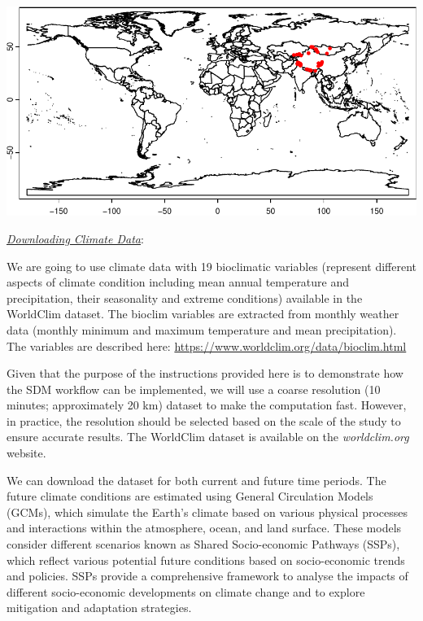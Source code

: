 \documentclass[
]{article}
\begin{document}
\includegraphics{sdm_R_files/figure-latex/unnamed-chunk-1-1.pdf}

\uline{\textit{Downloading Climate Data}}:

We are going to use climate data with 19 bioclimatic variables
(represent different aspects of climate condition including mean annual
temperature and precipitation, their seasonality and extreme conditions)
available in the WorldClim dataset. The bioclim variables are extracted
from monthly weather data (monthly minimum and maximum temperature and
mean precipitation). The variables are described here:
\url{https://www.worldclim.org/data/bioclim.html}

Given that the purpose of the instructions provided here is to
demonstrate how the SDM workflow can be implemented, we will use a
coarse resolution (10 minutes; approximately 20 km) dataset to make the
computation fast. However, in practice, the resolution should be
selected based on the scale of the study to ensure accurate results. The
WorldClim dataset is available on the \emph{worldclim.org} website.

We can download the dataset for both current and future time periods.
The future climate conditions are estimated using General Circulation
Models (GCMs), which simulate the Earth's climate based on various
physical processes and interactions within the atmosphere, ocean, and
land surface. These models consider different scenarios known as Shared
Socio-economic Pathways (SSPs), which reflect various potential future
conditions based on socio-economic trends and policies. SSPs provide a
comprehensive framework to analyse the impacts of different
socio-economic developments on climate change and to explore mitigation
and adaptation strategies.
\end{document}

